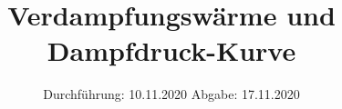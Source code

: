 

\subject{Versuch Nr.203}
\title{Verdampfungswärme und Dampfdruck-Kurve}
\date{%
  Durchführung: 10.11.2020
  \hspace{3em}
  Abgabe: 17.11.2020
}



\maketitle
\thispagestyle{empty}
\tableofcontents
\newpage 








\nocite{*}

\printbibliography{}

